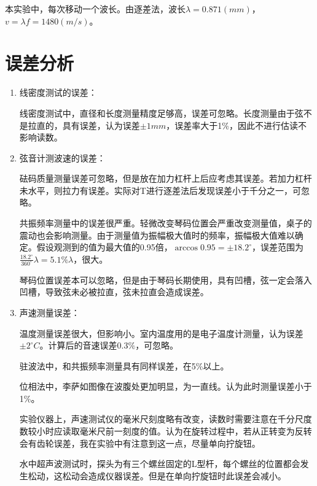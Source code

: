 \documentclass[11pt]{article}
\begin{document}
\par 本实验中，每次移动一个波长。由逐差法，波长$\lambda=0.871(mm)$，$v=\lambda f=1480(m/s)$。

\section{误差分析}
\begin{enumerate}
    \item 线密度测试的误差：
    \par \hspace*{2em}线密度测试中，直径和长度测量精度足够高，误差可忽略。长度测量由于弦不是拉直的，具有误差，认为误差$\pm 1mm$，误差率大于1\%，因此不进行估读不影响读数。
    \item 弦音计测波速的误差：
    \par \hspace*{2em}砝码质量测量误差可忽略，但是放在加力杠杆上后应考虑其误差。若加力杠杆未水平，则拉力有误差。实际对T进行逐差法后发现误差小于千分之一，可忽略。
    \par \hspace*{2em}共振频率测量中的误差很严重。轻微改变琴码位置会严重改变测量值，桌子的震动也会影响测量。由于测量值为振幅极大值时的频率，振幅极大值难以确定。假设观测到的值为最大值的0.95倍，$\arccos 0.95=\pm18.2^\circ$，误差范围为$\frac{18.2^\circ}{360^\circ}\lambda=5.1\%\lambda$，很大。
    \par \hspace*{2em}琴码位置误差本可以忽略，但是由于琴码长期使用，具有凹槽，弦一定会落入凹槽，导致弦未必被拉直，弦未拉直会造成误差。
    \item 声速测量误差：
    \par \hspace*{2em}温度测量误差很大，但影响小。室内温度用的是电子温度计测量，认为误差$\pm 2^\circ C$。计算后的音速误差$0.3\%$，可忽略。
    \par \hspace*{2em}驻波法中，和共振频率测量具有同样误差，在5\%以上。
    \par \hspace*{2em}位相法中，李萨如图像在波腹处更加明显，为一直线。认为此时测量误差小于1\%。
    \par \hspace*{2em}实验仪器上，声速测试仪的毫米尺刻度略有改变，读数时需要注意在千分尺度数较小时应读取毫米尺前一刻度的值。认为在旋转过程中，若从正转变为反转会有齿轮误差，我在实验中有注意到这一点，尽量单向拧旋钮。
    \par \hspace*{2em}水中超声波测试时，探头为有三个螺丝固定的L型杆，每个螺丝的位置都会发生松动，这松动会造成仪器误差。但是在单向拧旋钮时此误差会减小。
\end{enumerate}
\end{document}
